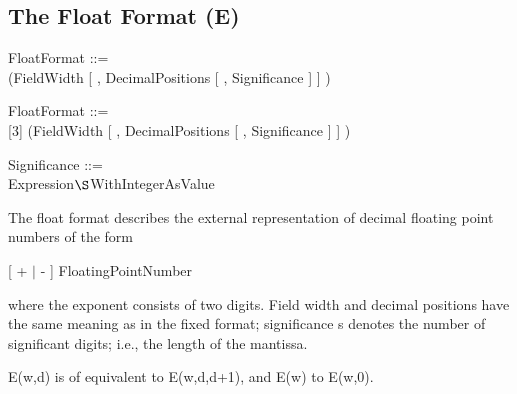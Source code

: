 \subsection{The Float Format (E)}   %
\label{sec_dation_e_format}

\begin{removed}
FloatFormat ::=\\
 (FieldWidth [ , DecimalPositions [ , Significance ] ] )
\end{removed}
\begin{added}
FloatFormat ::=\\
[3] (FieldWidth [ , DecimalPositions [ , Significance ] ] )
\end{added}

Significance ::= \\
\x Expression$\S $WithIntegerAsValue

The float format describes the external representation of decimal
floating point numbers of the form

[ + $\mid$ - ] FloatingPointNumber

where the exponent consists of two  digits.
 Field width and decimal
positions have the same meaning as in the fixed format; significance s
denotes the number of significant digits; i.e., the length of the
mantissa.

E(w,d) is of equivalent to E(w,d,d+1), and E(w) to E(w,0).

